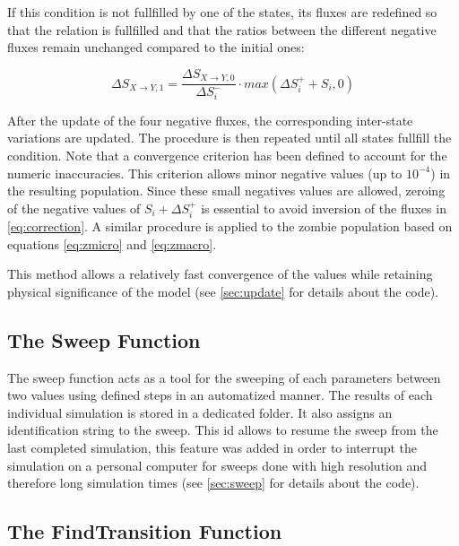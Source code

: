 \documentclass[11pt]{article} %
\begin{document}
If this condition is not fullfilled by one of the states, its fluxes are redefined so that the relation is fullfilled and that the ratios between the different negative fluxes remain unchanged compared to the initial ones:

\bigskip
\begin{equation} \label{eq:correction}
\Delta S_{X\rightarrow Y,1} = \frac{\Delta S_{X\rightarrow Y,0}}{\Delta S_i^-}\cdot max(\Delta S_i^+ + S_i, 0)
\end{equation}
\bigskip

After the update of the four negative fluxes, the corresponding inter-state variations are updated. The procedure is then repeated until all states fullfill the condition. Note that a convergence criterion has been defined to account for the numeric inaccuracies. This criterion allows minor negative values (up to $10^{-4}$) in the resulting population. Since these small negatives values are allowed, zeroing of the negative values of $S_i + \Delta S_i^+$ is essential to avoid inversion of the fluxes in \eqref{eq:correction}. A similar procedure is applied to the zombie population based on equations \eqref{eq:zmicro} and \eqref{eq:zmacro}.

This method allows a relatively fast convergence of the values while retaining physical significance of the model (see \ref{sec:update} for details about the code).



\subsection{The Sweep Function}\indent

The sweep function acts as a tool for the sweeping of each parameters between two values using defined steps in an automatized manner. The results of each individual simulation is stored in a dedicated folder. It also assigns an identification string to the sweep. This id allows to resume the sweep from the last completed simulation, this feature was added in order to interrupt the simulation on a personal computer for sweeps done with high resolution and therefore long simulation times (see \ref{sec:sweep} for details about the code).


\subsection{The FindTransition Function}\indent
\label{sec:findTransition}
\end{document}
